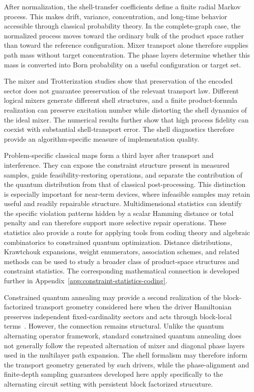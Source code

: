 \documentclass[a4paper,onecolumn,11pt,unpublished]{quantumarticle}
\theoremstyle{remark}
\begin{document}
After normalization, the shell-transfer coefficients define a finite radial Markov process. This makes drift, variance, concentration, and long-time behavior accessible through classical probability theory. In the complete-graph case, the normalized process moves toward the ordinary bulk of
the product space rather than toward the reference configuration. Mixer
transport alone therefore supplies path mass without target
concentration. The phase layers determine whether this mass is converted into
Born probability on a useful configuration or target set.

The mixer and Trotterization studies show that preservation of the encoded
sector does not guarantee preservation of the relevant transport law.
Different logical mixers generate different shell structures, and a finite
product-formula realization can preserve excitation number while distorting
the shell dynamics of the ideal mixer. The numerical results further show
that high process fidelity can coexist with substantial shell-transport
error. The shell diagnostics therefore provide an algorithm-specific measure
of implementation quality.

Problem-specific classical maps form a third layer after transport and interference. They can  expose the constraint structure present in measured samples, guide feasibility-restoring operations, and separate the contribution of the quantum distribution from that of classical post-processing. This distinction is especially important for near-term
devices, where infeasible samples may retain useful and readily repairable structure. Multidimensional statistics can identify the specific violation patterns hidden by a scalar Hamming distance or total penalty and can therefore support more selective repair operations. These statistics also provide a route for applying tools from coding theory
and algebraic combinatorics to constrained quantum optimization. Distance distributions, Krawtchouk expansions, weight enumerators, association schemes, and related methods can be used to study a broader class of product-space structures and constraint statistics. The corresponding
mathematical connection is developed further in
Appendix~\ref{app:constraint-statistics-coding}.


Constrained quantum annealing may provide a second realization of the block-factorized transport geometry considered here when the driver Hamiltonian preserves independent fixed-cardinality sectors and acts through
block-local terms~\cite{HenSpedalieri2016,HenSarandy2016,leipold2026imposing}. However, the connection remains structural. Unlike the quantum alternating operator framework, standard constrained quantum annealing does not generally follow
the repeated alternation of mixer and diagonal phase layers used in the multilayer path expansion. The shell formalism may therefore inform the transport geometry generated by such drivers, while the phase-alignment and finite-depth sampling guarantees developed here apply specifically to the alternating circuit setting with persistent block factorized strucuture.
\end{document}
